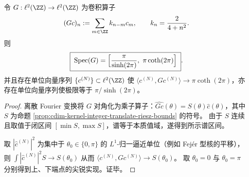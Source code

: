 \begin{proposition}\label{prop:cdim-kernel-gram-convolution-spectrum}
令 \(G:\ell^2(\ZZ)\to\ell^2(\ZZ)\) 为卷积算子
\[
(Gc)_n:=\sum_{m\in\ZZ}k_{n-m}c_m,
\qquad
k_n=\frac{2}{4+n^2}.
\]
则
\[
\boxed{\;
\mathrm{Spec}(G)=\Bigl[\frac{\pi}{\sinh(2\pi)},\ \pi\coth(2\pi)\Bigr]\; }.
\]
并且存在单位向量序列 \(\{c^{(N)}\}\subset\ell^2(\ZZ)\) 使
\(
\langle c^{(N)},Gc^{(N)}\rangle\to \pi\coth(2\pi)
\)，亦存在单位向量序列使极限等于 \(\pi/\sinh(2\pi)\)。
\end{proposition}
\begin{proof}
离散 Fourier 变换将 \(G\) 对角化为乘子算子：\(\widehat{Gc}(\theta)=S(\theta)\widehat c(\theta)\)，其中 \(S\) 为命题 \ref{prop:cdim-kernel-integer-translate-riesz-bounds} 的符号。
由于 \(S\) 连续且取值于闭区间 \([\min S,\max S]\)，谱等于本质值域，遂得到所示谱区间。
\par
取 \(|\widehat c^{(N)}|^2\) 为集中于 \(\theta_0\in\{0,\pi\}\) 的 \(L^1\)-归一逼近单位（例如 Fej\'er 型核的平移），则
\(
\int |\widehat c^{(N)}|^2S\to S(\theta_0)
\)
从而 \(\langle c^{(N)},Gc^{(N)}\rangle\to S(\theta_0)\)。
取 \(\theta_0=0\) 与 \(\theta_0=\pi\) 分别得到上、下端点的尖锐实现。证毕。
\end{proof}

\endinput
